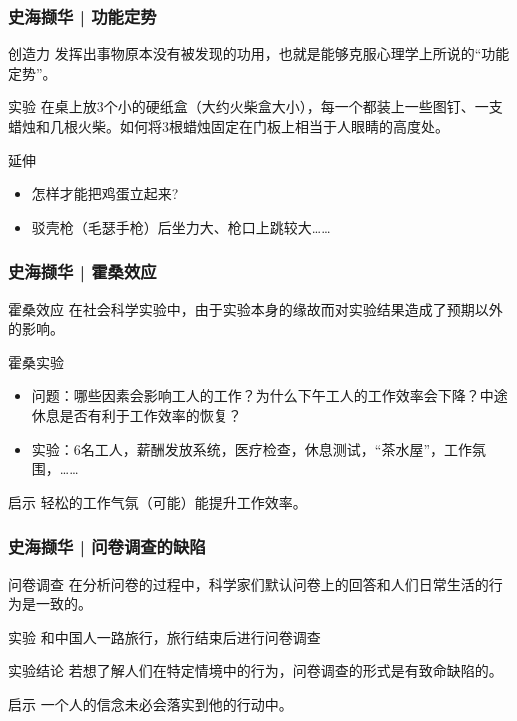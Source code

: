 \begin{frame}
  \frametitle{史海撷华 | 功能定势}
  \begin{block}{创造力}
    发挥出事物原本没有被发现的功用，也就是能够克服心理学上所说的“功能定势”。
  \end{block}
  \pause
  \begin{block}{实验}
    在桌上放3个小的硬纸盒（大约火柴盒大小），每一个都装上一些图钉、一支蜡烛和几根火柴。如何将3根蜡烛固定在门板上相当于人眼睛的高度处。
  \end{block}
  \pause
  \begin{block}{延伸}
    \begin{itemize}
      \item 怎样才能把鸡蛋立起来?
      \item 驳壳枪（毛瑟手枪）后坐力大、枪口上跳较大……
    \end{itemize}
  \end{block}
\end{frame}

\begin{frame}
  \frametitle{史海撷华 | 霍桑效应}
  \begin{block}{霍桑效应}
    在社会科学实验中，由于实验本身的缘故而对实验结果造成了预期以外的影响。
  \end{block}
  \pause
  \begin{block}{霍桑实验}
    \begin{itemize}
      \item 问题：哪些因素会影响工人的工作？为什么下午工人的工作效率会下降？中途休息是否有利于工作效率的恢复？
      \item 实验：6名工人，薪酬发放系统，医疗检查，休息测试，“茶水屋”，工作氛围，……
    \end{itemize}
  \end{block}
  \pause
  \begin{block}{启示}
    轻松的工作气氛（可能）能提升工作效率。
  \end{block}
\end{frame}

\begin{frame}
  \frametitle{史海撷华 | 问卷调查的缺陷}
  \begin{block}{问卷调查}
    在分析问卷的过程中，科学家们默认问卷上的回答和人们日常生活的行为是一致的。
  \end{block}
  \pause
  \begin{block}{实验}
    和中国人一路旅行，旅行结束后进行问卷调查
  \end{block}
  \pause
  \begin{block}{实验结论}
    若想了解人们在特定情境中的行为，问卷调查的形式是有致命缺陷的。
  \end{block}
  \pause
  \begin{block}{启示}
    一个人的信念未必会落实到他的行动中。
  \end{block}
\end{frame}

